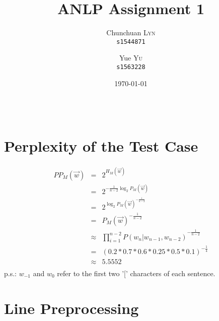 \documentclass{article}
\title{ANLP Assignment 1} %
\author{
	Chunchuan \textsc{Lyn}\\
	\texttt{s1544871}
	\and
	Yue \textsc{Yu}\\
	\texttt{s1563228}
}
\date{\today} %
\begin{document}
\maketitle %

\begin{center}
\begin{tabular}{l r}
\end{tabular}
\end{center}


\section{Perplexity of the Test Case}

\begin{eqnarray*}
	PP_M(\vec{w}) &=& 2^{H_M(\vec{w})}  \\
	&=& 2^{-\frac{1}{n-2} \log_2 P_M(\vec{w}) }  \\
	&=& 2^{\log_2 P_M(\vec{w})^{-\frac{1}{n-2}}} \\
	&=& P_M(\vec{w})^{-\frac{1}{n-2}} \\
	&\approx& {\prod_{i=1}^{n-2} P(w_n|w_{n-1},w_{n-2})}^{-\frac{1}{n-2}} \\
	&=& (0.2*0.7*0.6*0.25*0.5*0.1)^{-\frac{1}{4}} \\
	&\approx& 5.5552 \nonumber \\
\end{eqnarray*}
p.s.: $w_{-1}$ and $w_0$ refer to the first two {'['} characters of each sentence.

\section{Line Preprocessing}
\end{document}
